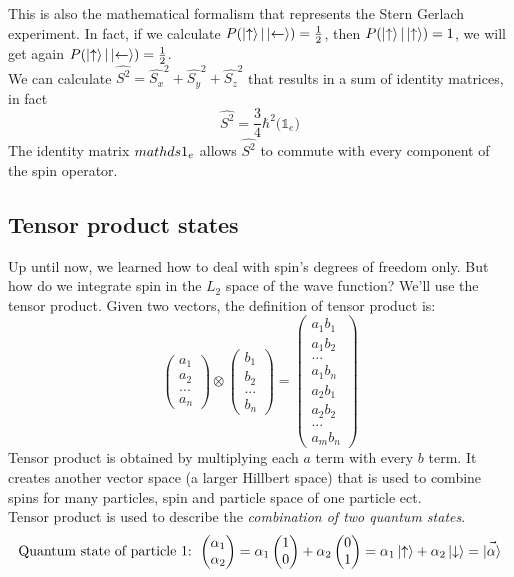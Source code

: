 This is also the mathematical formalism that represents the Stern Gerlach experiment. In fact, if we calculate $P(\ket{\uparrow}|\ket{\leftarrow}) = \frac{1}{2}$, then $P(\ket{\uparrow}|\ket{\uparrow}) = 1$, we will get again $P(\ket{\uparrow}|\ket{\leftarrow}) = \frac{1}{2}$.  \\
We can calculate $\hat{S^2} = \hat{S_x}^2+\hat{S_y}^2+\hat{S_z}^2$ that results in a sum of identity matrices, in fact
\[\hat{S^2}=\frac{3}{4}\hbar^2\big(\mathds{1}_e\big)\]
The identity matrix $\\mathds{1}_e$ allows $\hat{S^2}$ to commute with every component of the spin operator.

\subsection{Tensor product states}
Up until now, we learned how to deal with spin's degrees of freedom only. But how do we integrate spin in the $L_2$ space of the wave function? We'll use the tensor product. Given two vectors, the definition of tensor product is:
\[
\begin{pmatrix}a_1\\a_2\\...\\a_n\end{pmatrix}\otimes\begin{pmatrix}b_1\\b_2\\...\\b_n\end{pmatrix}=\begin{pmatrix}a_1b_1\\a_1b_2\\...\\a_1b_n\\a_2b_1\\a_2b_2\\...\\a_mb_n\end{pmatrix}
\]
Tensor product is obtained by multiplying each $a$ term with every $b$ term. It creates another vector space (a larger Hillbert space) that is used to combine spins for many particles, spin and particle space of one particle ect.\\
Tensor product is used to describe the \emph{combination of two quantum states}.
\[\text{Quantum state of particle 1: } \begin{pmatrix}\alpha_1\\\alpha_2\end{pmatrix}=\alpha_1\begin{pmatrix}1\\0\end{pmatrix}+\alpha_2\begin{pmatrix}0\\1\end{pmatrix}=\alpha_1\ket{\uparrow}+\alpha_2\ket{\downarrow}=\vec{\ket\alpha}\]
